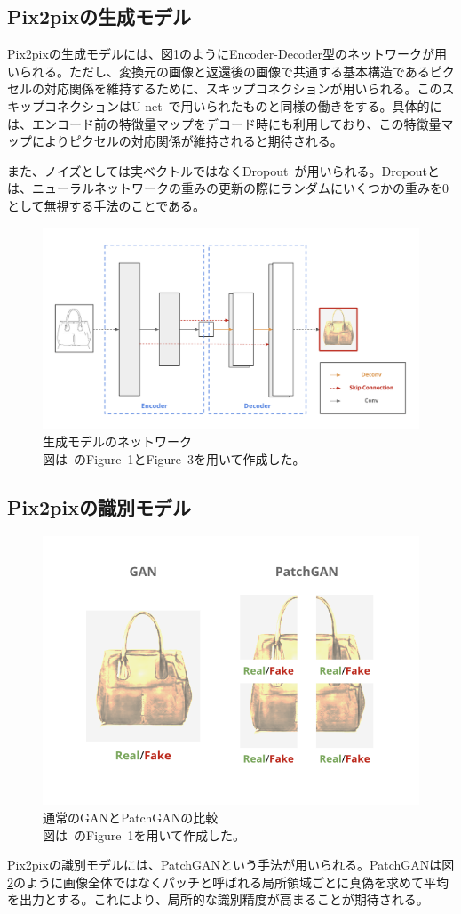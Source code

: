 \subsection{Pix2pixの生成モデル}

Pix2pixの生成モデルには、図\ref{fig:u-net}のようにEncoder-Decoder型のネットワークが用いられる。ただし、変換元の画像と返還後の画像で共通する基本構造であるピクセルの対応関係を維持するために、スキップコネクションが用いられる。このスキップコネクションはU-net~\cite{u-net}で用いられたものと同様の働きをする。具体的には、エンコード前の特徴量マップをデコード時にも利用しており、この特徴量マップによりピクセルの対応関係が維持されると期待される。

また、ノイズとしては実ベクトルではなくDropout~\cite{Dropout}が用いられる。Dropoutとは、ニューラルネットワークの重みの更新の際にランダムにいくつかの重みを0として無視する手法のことである。

\clearpage

\begin{figure}[t]
\begin{center}
\includegraphics[width=0.8\hsize]{figure/u-net.png}
\caption{生成モデルのネットワーク\\
図は~\cite{pix2pix}のFigure~1とFigure~3を用いて作成した。}
\label{fig:u-net}
\end{center}
\end{figure}

\subsection{Pix2pixの識別モデル}

\begin{figure}[b]
\begin{center}
\includegraphics[width=0.6\hsize]{figure/patchgan.png}
\caption{通常のGANとPatchGANの比較\\
図は~\cite{pix2pix}のFigure~1を用いて作成した。}
\label{fig:patchgan}
\end{center}
\end{figure}

Pix2pixの識別モデルには、PatchGANという手法が用いられる。PatchGANは図\ref{fig:patchgan}のように画像全体ではなくパッチと呼ばれる局所領域ごとに真偽を求めて平均を出力とする。これにより、局所的な識別精度が高まることが期待される。